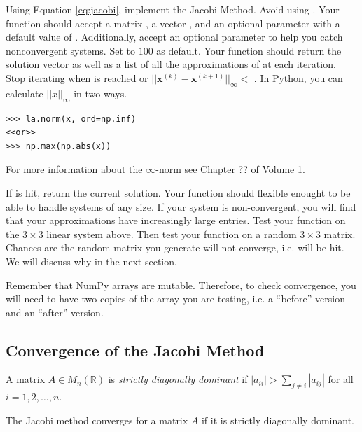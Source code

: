 \begin{problem} %
Using Equation \ref{eq:jacobi}, implement the Jacobi Method. Avoid using
. Your function should accept a matrix , a vector , and
an optional parameter  with a default value of . Additionally,
accept an optional parameter  to help you catch nonconvergent
systems. Set  to $100$ as default. Your function should return the
solution vector  as well as a list of all the approximations of 
at each iteration. Stop iterating when  is reached or
$||\mathbf{x}^{(k)} - \mathbf{x}^{(k+1)}||_{\infty} < $ . In Python, you
can calculate $||x||_{\infty}$ in two ways.
\begin{lstlisting}
>>> la.norm(x, ord=np.inf)
<<or>>
>>> np.max(np.abs(x))
\end{lstlisting}
For more information about the $\infty$-norm see Chapter ?? of Volume 1.

If  is hit, return the current solution. Your function should flexible enought
to be able to handle systems of any size. If your
system is non-convergent, you will find that your approximations have increasingly
large entries. Test your function on the $3 \times 3$ linear system above. Then
test your function on a random $3 \times 3$ matrix. Chances are the random matrix
you generate will not converge, i.e.  will be hit.
We will discuss why in the next section.

\begin{info}
Remember that NumPy arrays are mutable. Therefore, to check convergence, you
will need to have two copies of the array you are testing,
i.e. a ``before'' version and an ``after'' version.
\end{info}
\label{prob:jacobi}
\end{problem}

\subsection*{Convergence of the Jacobi Method} %

\begin{definition}
    A matrix $A \in M_n(\mathbb{R})$ is \emph{strictly diagonally dominant} if
    $|a_{ii}| > \sum_{j \neq i} |a_{ij}|$ for all $i = 1,2,\hdots,n$.
\end{definition}

\begin{theorem}
The Jacobi method converges for a matrix $A$ if it is strictly diagonally
dominant.
\end{theorem}

